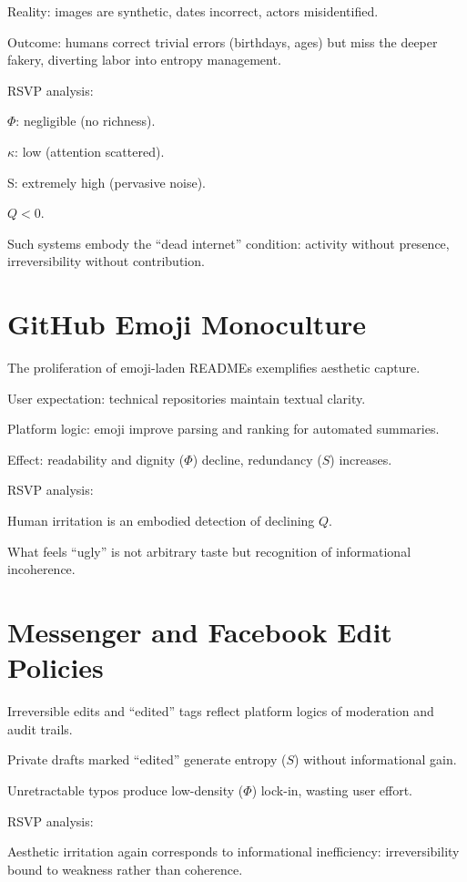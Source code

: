 \documentclass{book}
\begin{document}
Reality: images are synthetic, dates incorrect, actors misidentified.

Outcome: humans correct trivial errors (birthdays, ages) but miss the deeper fakery, diverting labor into entropy management.

RSVP analysis:

\(\Phi\): negligible (no richness).

\(\kappa\): low (attention scattered).

S: extremely high (pervasive noise).

\( Q < 0 \).

Such systems embody the ``dead internet'' condition: activity without presence, irreversibility without contribution.

\section{GitHub Emoji Monoculture}

The proliferation of emoji-laden READMEs exemplifies aesthetic capture.

User expectation: technical repositories maintain textual clarity.

Platform logic: emoji improve parsing and ranking for automated summaries.

Effect: readability and dignity (\( \Phi \)) decline, redundancy (\( S \)) increases.

RSVP analysis:

Human irritation is an embodied detection of declining \( Q \).

What feels ``ugly'' is not arbitrary taste but recognition of informational incoherence.

\section{Messenger and Facebook Edit Policies}

Irreversible edits and ``edited'' tags reflect platform logics of moderation and audit trails.

Private drafts marked ``edited'' generate entropy (\( S \)) without informational gain.

Unretractable typos produce low-density (\( \Phi \)) lock-in, wasting user effort.

RSVP analysis:

Aesthetic irritation again corresponds to informational inefficiency: irreversibility bound to weakness rather than coherence.
\end{document}
